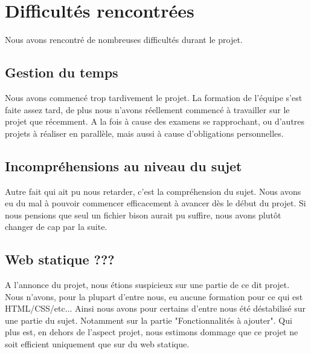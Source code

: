 \chapter{Difficultés rencontrées}

Nous avons rencontré de nombreuses difficultés durant le projet.\newline

\section{Gestion du temps}

Nous avons commencé trop tardivement le projet. La formation de l'équipe s'est faite assez tard, de plus nous n'avons réellement commencé à travailler sur le projet que récemment.\newline
A la fois à cause des examens se rapprochant, ou d'autres projets à réaliser en parallèle, mais aussi à cause d'obligations personnelles.\newline

\section{Incompréhensions au niveau du sujet}

Autre fait qui ait pu nous retarder, c'est la compréhension du sujet.\newline
Nous avons eu du mal à pouvoir commencer efficacement à avancer dès le début du projet. Si nous pensions que seul un fichier bison aurait pu suffire, nous avons plutôt changer de cap par la suite.\newline
\newline

\section{Web statique ???}

A l'annonce du projet, nous étions suspicieux sur une partie de ce dit projet.\newline
Nous n'avons, pour la plupart d'entre nous, eu aucune formation pour ce qui est HTML/CSS/etc...
\newline
Ainsi nous avons pour certains d'entre nous été déstabilisé sur une partie du sujet. Notamment sur la partie "Fonctionnalités à ajouter".\newline
Qui plus est, en dehors de l'aspect projet, nous estimons dommage que ce projet ne soit efficient uniquement que sur du web statique.

